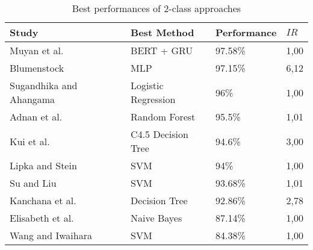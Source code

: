 \begin{table}[ht]
    \caption{Best performances of 2-class approaches}
    \label{tab:ml_performance_2class}
    \centering
    \begin{tabular}{l l l l}
        \toprule
        \textbf{Study} & \textbf{Best Method} & \textbf{Performance} & \textbf{$IR$}\\ 
        \midrule
        Muyan et al.~\cite{Li2022_lr2019} & BERT + GRU & 97.58\% & 1,00 \\
        Blumenstock~\cite{Blumenstock2008_lr4} & MLP & 97.15\% & 6,12 \\
        Sugandhika and Ahangama~\cite{Sugandhika2022_lr119} & Logistic Regression & 96\% & 1,00 \\
        Adnan et al.~\cite{Yahya2020_lr2011} & Random Forest & 95.5\% & 1,01 \\
        Kui et al.~\cite{Xiao2013_lr2030} & C4.5 Decision Tree & 94.6\% & 3,00 \\
        Lipka and Stein~\cite{Lipka2010_lr1019} & SVM & 94\% & 1,00 \\
        Su and Liu~\cite{Su2015_lr128} & SVM & 93.68\% & 1,01 \\
        Kanchana et al.~\cite{Saengthongpattana2018_lr150} & Decision Tree & 92.86\% & 2,78 \\
        Elisabeth et al.~\cite{Lex2012_lr1026} & Naive Bayes & 87.14\% & 1,00 \\
        Wang and Iwaihara~\cite{Wang2010_lr70} & SVM & 84.38\% & 1,00 \\
        \bottomrule
    \end{tabular}
\end{table}